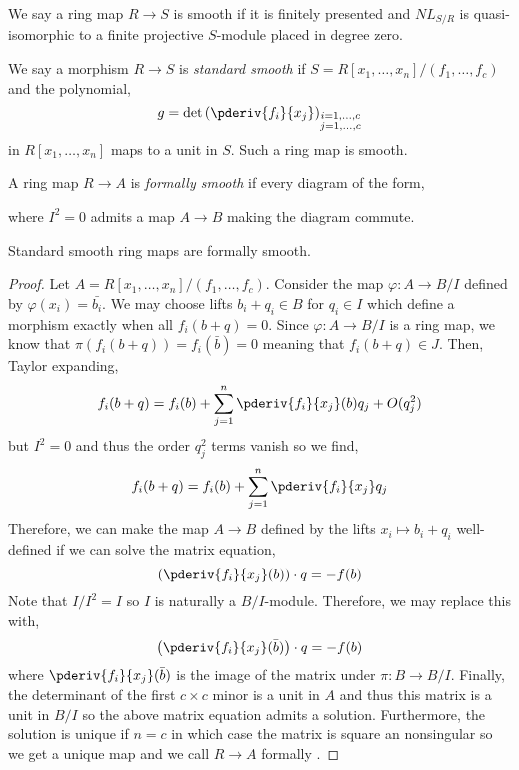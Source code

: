 \documentclass[12pt]{article}
\begin{document}
\begin{defn}
We say a ring map $R \to S$ is smooth if it is finitely presented and $NL_{S/R}$ is quasi-isomorphic to a finite projective $S$-module placed in degree zero. 
\end{defn}

\begin{example}
We say a morphism $R \to S$ is \textit{standard smooth} if $S = R[x_1, \dots, x_n]/(f_1, \dots, f_c)$ and the polynomial,
\[ g = \det{\left( \pderiv{f_i}{x_j} \right)_{\substack{i = 1, \dots, c \\ j = 1, \dots, c}}} \]
in $R[x_1, \dots, x_n]$ maps to a unit in $S$. Such a ring map is smooth. 
\end{example}

\begin{defn}
A ring map $R \to A$ is \textit{formally smooth} if every diagram of the form,
\begin{center}
\end{center}
where $I^2 = 0$ admits a map $A \to B$ making the diagram commute.
\end{defn}

\begin{prop}
Standard smooth ring maps are formally smooth.
\end{prop}

\begin{proof}
Let $A = R[x_1, \dots, x_n]/(f_1, \dots, f_c)$. Consider the map $\varphi : A \to B / I$ defined by $\varphi(x_i) = \bar{b_i}$. We may choose lifts $b_i + q_i \in B$ for $q_i \in I$ which define a morphism exactly when all $f_i(b + q) = 0$. Since $\varphi : A \to B/I$ is a ring map, we know that $\pi(f_i(b + q)) = f_i(\bar{b}) = 0$ meaning that $f_i(b + q) \in J$. Then, Taylor expanding,
\[ f_i(b + q) = f_i(b) + \sum_{j = 1}^n \pderiv{f_i}{x_j} (b) q_j + O(q_j^2) \]
but $I^2 = 0$ and thus the order $q_j^2$ terms vanish so we find,
\[ f_i(b + q) = f_i(b) + \sum_{j = 1}^n \pderiv{f_i}{x_j} q_j \]
Therefore, we can make the map $A \to B$ defined by the lifts $x_i \mapsto b_i + q_i$ well-defined if we can solve the matrix equation,
\[ \left( \pderiv{f_i}{x_j}(b) \right) \cdot q = - f(b) \]
Note that $I / I^2 = I$ so $I$ is naturally a $B/I$-module. Therefore, we may replace this with,
\[ \left( \pderiv{f_i}{x_j}(\bar{b}) \right) \cdot q = - f(b) \]
where $\pderiv{f_i}{x_j}(\bar{b})$ is the image of the matrix under $\pi : B \to B/I$. Finally, the determinant of the first $c \times c$ minor is a unit in $A$ and thus this matrix is a unit in $B/I$ so the above matrix equation admits a solution. Furthermore, the solution is unique if $n = c$ in which case the matrix is square an nonsingular so we get a unique map and we call $R \to A$ formally \etale. 
\end{proof}
\end{document}

